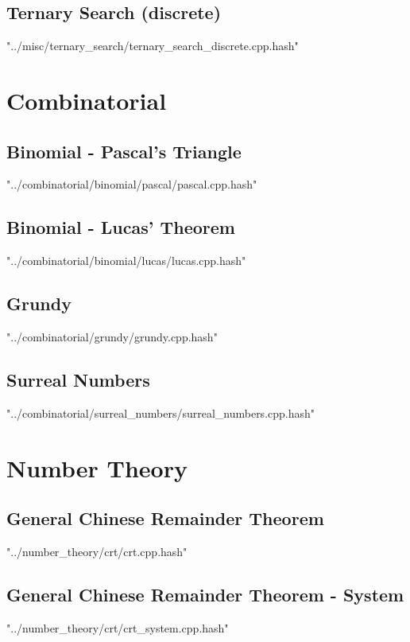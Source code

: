 \documentclass [5pt,twocolumn,oneside]{article}
\begin{document}
\begin{landscape}
\begin{multicols}{3}
\subsection{ Ternary Search (discrete)}
 {"../misc/ternary_search/ternary_search_discrete.cpp.hash"}



\section{Combinatorial}
\subsection{ Binomial - Pascal's Triangle}
 {"../combinatorial/binomial/pascal/pascal.cpp.hash"}


\subsection{ Binomial - Lucas' Theorem}
 {"../combinatorial/binomial/lucas/lucas.cpp.hash"}


\subsection{ Grundy}
 {"../combinatorial/grundy/grundy.cpp.hash"}


\subsection{ Surreal Numbers}
 {"../combinatorial/surreal_numbers/surreal_numbers.cpp.hash"}



\section{Number Theory}
\subsection{ General Chinese Remainder Theorem}
 {"../number_theory/crt/crt.cpp.hash"}


\subsection{ General Chinese Remainder Theorem - System}
 {"../number_theory/crt/crt_system.cpp.hash"}



\end{multicols}
\end{landscape}
\end{document}
